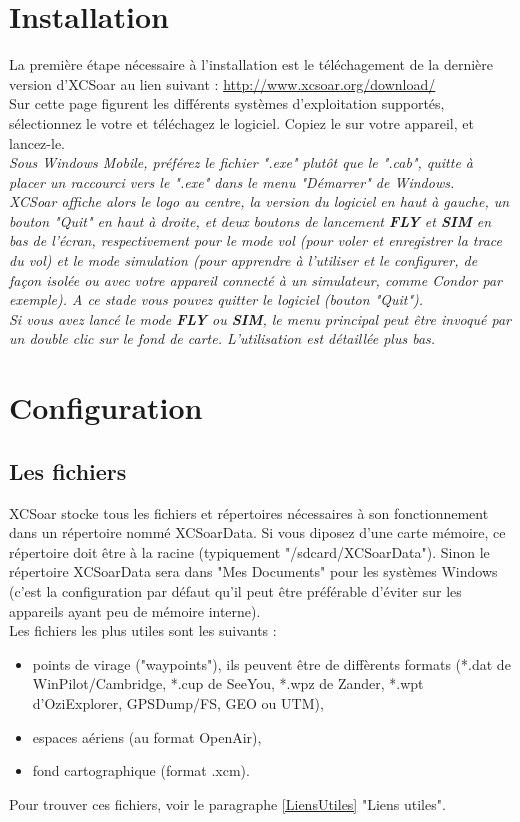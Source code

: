 \documentclass{article}
\begin{document}
\section{Installation}
\noindent
La première étape nécessaire à l'installation est le téléchagement de la dernière version d'XCSoar au lien suivant : \url{http://www.xcsoar.org/download/}\\
Sur cette page figurent les différents systèmes d'exploitation supportés, sélectionnez le votre et téléchagez le logiciel. Copiez le sur votre appareil, et lancez-le.\\
%
\newline
%
\itshape Sous Windows Mobile, préférez le fichier ".exe" plutôt que le ".cab", quitte à placer un raccourci vers le ".exe" dans le menu "Démarrer" de Windows.\upshape\\
\newline
XCSoar affiche alors le logo au centre, la version du logiciel en haut à gauche, un bouton "Quit" en haut à droite, et deux boutons de lancement \textbf{FLY} et \textbf{SIM} en bas de l'écran, respectivement pour le mode vol (pour voler et enregistrer la trace du vol) et le mode simulation (pour apprendre à l'utiliser et le configurer, de façon isolée ou avec votre appareil connecté à un simulateur, comme Condor par exemple). A ce stade vous pouvez quitter le logiciel (bouton "Quit").\\
%
Si vous avez lancé le mode \textbf{FLY} ou \textbf{SIM}, le menu principal peut être invoqué par un double clic sur le fond de carte.
L'utilisation est détaillée plus bas.
%
\section{Configuration}
%
\subsection{Les fichiers}
\noindent
XCSoar stocke tous les fichiers et répertoires nécessaires à son fonctionnement dans un répertoire nommé XCSoarData. Si vous diposez d'une carte mémoire, ce répertoire doit être à la racine (typiquement "/sdcard/XCSoarData"). Sinon le répertoire XCSoarData sera dans "Mes Documents" pour les systèmes Windows (c'est la configuration par défaut qu'il peut être préférable d'éviter sur les appareils ayant  peu de mémoire interne).\\
Les fichiers les plus utiles sont les suivants :
\begin{itemize}
\item points de virage ("waypoints"), ils peuvent être de diffèrents formats (*.dat de WinPilot/Cambridge, *.cup de SeeYou, *.wpz de Zander, *.wpt d'OziExplorer, GPSDump/FS, GEO ou UTM),
\item espaces aériens (au format OpenAir),
\item fond cartographique (format .xcm).
\end{itemize}
%
Pour trouver ces fichiers, voir le paragraphe \ref{LiensUtiles} "Liens utiles".
%
\end{document}
